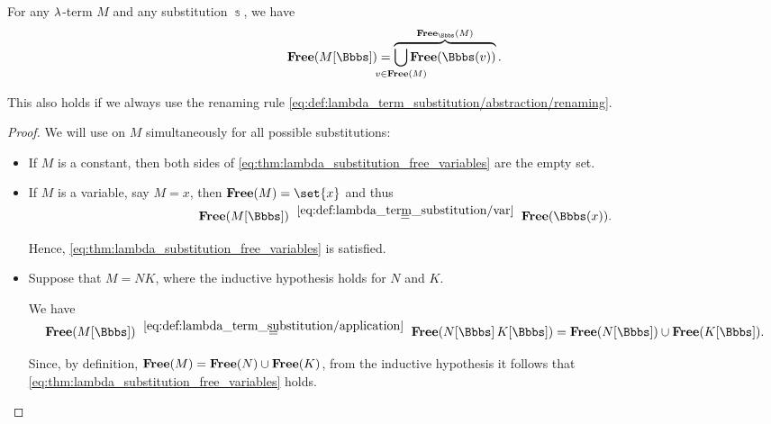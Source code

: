 \begin{proposition}\label{thm:lambda_substitution_free_variables}
  For any \( \mathrm{\lambda} \)-term \( M \) and any substitution \( \Bbbs \), we have
  \begin{equation}\label{eq:thm:lambda_substitution_free_variables}
    \op*{Free}( M[\Bbbs] ) = \overbrace{\bigcup_{\mathclap{v \in \op*{Free}(M)}} \op*{Free}(\Bbbs(v))}^{\op*{Free}_\Bbbs(M)}.
  \end{equation}

  This also holds if we always use the renaming rule \eqref{eq:def:lambda_term_substitution/abstraction/renaming}.
\end{proposition}
\begin{proof}
  We will use  on \( M \) simultaneously for all possible substitutions:
  \begin{itemize}
    \item If \( M \) is a constant, then both sides of \eqref{eq:thm:lambda_substitution_free_variables} are the empty set.

    \item If \( M \) is a variable, say \( M = x \), then \( \op*{Free}(M) = \set{ x } \) and thus
    \begin{equation*}
      \op*{Free}(M[\Bbbs])
      \reloset {\eqref{eq:def:lambda_term_substitution/var}} =
      \op*{Free}(\Bbbs(x)).
    \end{equation*}

    Hence, \eqref{eq:thm:lambda_substitution_free_variables} is satisfied.

    \item Suppose that \( M = NK \), where the inductive hypothesis holds for \( N \) and \( K \).

    We have
    \begin{equation*}
      \op*{Free}(M[\Bbbs])
      \reloset {\eqref{eq:def:lambda_term_substitution/application}} =
      \op*{Free}(N[\Bbbs] \thinspace K[\Bbbs])
      =
      \op*{Free}(N[\Bbbs]) \cup \op*{Free}(K[\Bbbs]).
    \end{equation*}

    Since, by definition, \( \op*{Free}(M) = \op*{Free}(N) \cup \op*{Free}(K) \), from the inductive hypothesis it follows that \eqref{eq:thm:lambda_substitution_free_variables} holds.


\end{itemize}
\end{proof}
